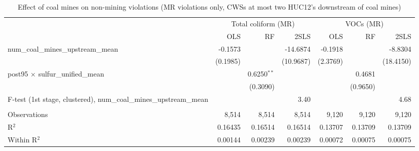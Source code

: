 
\begin{table}[htbp]
   
   \caption{\label{2sls_dwnstrm2step_nonminevio_mr} Effect of coal mines on non-mining violations (MR violations only, CWSs at most two HUC12's downstream of coal mines)}
   \bigskip
   
   \centering
   
   \begin{adjustbox}{width = \textwidth, center}
      
      
      \begin{tabular}{lrrrrrr}
         \toprule
         
          & \multicolumn{3}{c}{Total coliform (MR)} & \multicolumn{3}{c}{VOCs (MR)}\\
         
                                                                             & OLS      & RF            & 2SLS      & OLS      & RF       & 2SLS\\  
         
         \midrule 
         num\_coal\_mines\_upstream\_mean                                    & -0.1573  &               & -14.6874  & -0.1918  &          & -8.8304\\   
                                                                             & (0.1985) &               & (10.9687) & (2.3769) &          & (18.4150)\\   
         post95 $\times$ sulfur\_unified\_mean                               &          & 0.6250$^{**}$ &           &          & 0.4681   &   \\   
                                                                             &          & (0.3090)      &           &          & (0.9650) &   \\   
         
         F-test (1st stage, clustered), num\_coal\_mines\_upstream\_mean     &          &               & 3.40      &          &          & 4.68\\  
         
          \\
         
         Observations                                                        & 8,514    & 8,514         & 8,514     & 9,120    & 9,120    & 9,120\\  
         R$^2$                                                               & 0.16435  & 0.16514       & 0.16514   & 0.13707  & 0.13709  & 0.13709\\  
         Within R$^2$                                                        & 0.00144  & 0.00239       & 0.00239   & 0.00072  & 0.00075  & 0.00075\\  
         

\end{tabular}
\end{adjustbox}
\end{table}

